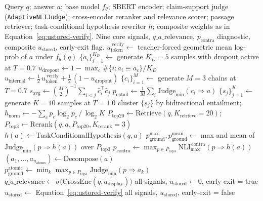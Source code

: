 \begin{algorithm}
\caption{Stage~5 unified verifier.}
\label{alg:verifier}
\begin{algorithmic}[1]
\Require Query $q$; answer $a$; base model $f_{\theta}$; SBERT encoder; claim-support judge (\texttt{AdaptiveNLIJudge}); cross-encoder reranker and relevance scorer; passage retriever; task-conditional hypothesis rewriter $h$; composite weights as in Equation~\ref{eq:ustored-verify}.
\Ensure Nine core signals, $q\_a\_\text{relevance}$, $p_{\text{contra}}$ diagnostic, composite $u_{\text{stored}}$, early-exit flag.
\State $u_{\text{token}}^{\,\text{verify}} \gets$ teacher-forced geometric mean log-prob of $a$ under $f_{\theta}(q)$
\State $\{a_{i}\}_{i=1}^{K_{D}} \gets$ generate $K_{D} = 5$ samples with dropout active at $T = 0.7$
\State $u_{\text{dropout}} \gets 1 - \max_{c} \#\{i : a_{i} \equiv a_{c}\} / K_{D}$
\State $u_{\text{internal}} \gets \tfrac{1}{2}\,u_{\text{token}}^{\,\text{verify}} + \tfrac{1}{2}\,(1 - u_{\text{dropout}})$
\State $\{c_{i}\}_{i=1}^{M} \gets$ generate $M = 3$ chains at $T = 0.7$
\State $s_{\text{avg}} \gets \binom{M}{2}^{-1}\sum_{i < j} \hat{c}_{i}^{\top}\hat{c}_{j}$
\State $p_{\text{entail}} \gets \tfrac{1}{M}\sum_{i} \mathrm{Judge}_{\min}(c_{i} \Rightarrow a)$
\State $\{s_{j}\}_{j=1}^{K} \gets$ generate $K = 10$ samples at $T = 1.0$
\State cluster $\{s_{j}\}$ by bidirectional entailment; $h_{\text{norm}} \gets -\sum_{c} p_{c}\log_{2} p_{c} \,/\, \log_{2} K$
\State $P_{\text{top20}} \gets \mathrm{Retrieve}(q, K_{\text{retrieve}} = 20)$; \; $P_{\text{top3}} \gets \mathrm{Rerank}(q, a, P_{\text{top20}}, K_{\text{rerank}} = 3)$
\State $h(a) \gets \mathrm{TaskConditionalHypothesis}(q, a)$ 
\State $p_{\text{ground}}^{\max}, p_{\text{ground}}^{\text{mean}} \gets$ max and mean of $\mathrm{Judge}_{\min}(p \Rightarrow h(a))$ over $P_{\text{top3}}$
\State $p_{\text{contra}} \gets \max_{p \in P_{\text{top3}}} \mathrm{NLI}_{\max}^{\,\text{contra}}(p \Rightarrow h(a))$ 
\State $(a_{1},\dots,a_{n_{\text{atoms}}}) \gets \mathrm{Decompose}(a)$ 
\State $p_{\text{ground}}^{\text{atomic}} \gets \min_{k} \max_{p \in P_{\text{top3}}} \mathrm{Judge}_{\min}(p \Rightarrow a_{k})$
\State $q\_a\_\text{relevance} \gets \sigma\bigl(\mathrm{CrossEnc}(q, a_{\text{display}})\bigr)$
    \State \Return all signals, $u_{\text{stored}} \gets 0$, early-exit = true 
\EndIf
\State $u_{\text{stored}} \gets$ Equation~\ref{eq:ustored-verify}
\State \Return all signals, $u_{\text{stored}}$, early-exit = false
\end{algorithmic}
\end{algorithm}

